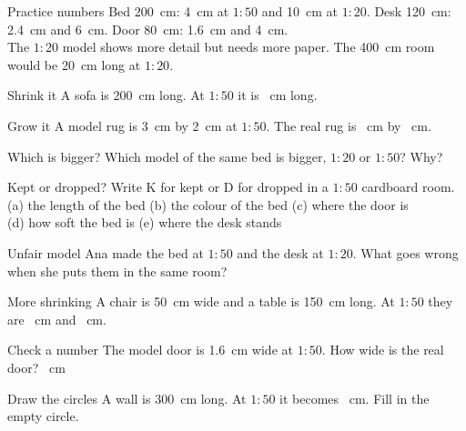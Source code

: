 \begin{worked}{Practice numbers}
Bed 200~cm: 4~cm at $1:50$ and 10~cm at $1:20$. Desk 120~cm: 2.4~cm and 6~cm. Door 80~cm: 1.6~cm and 4~cm.\\
The $1:20$ model shows more detail but needs more paper. The 400~cm room would be 20~cm long at $1:20$.
\end{worked}

\begin{puzzle}{Shrink it}
A sofa is 200~cm long. At $1:50$ it is \wline[1.6cm]~cm long.
\end{puzzle}

\begin{puzzle}{Grow it}
A model rug is 3~cm by 2~cm at $1:50$. The real rug is \wline[1.6cm]~cm by \wline[1.6cm]~cm.
\end{puzzle}

\begin{puzzle}{Which is bigger?}
Which model of the same bed is bigger, $1:20$ or $1:50$? \wline[2cm] Why? \wline[4cm]
\end{puzzle}

\begin{puzzle}{Kept or dropped?}
Write K for kept or D for dropped in a $1:50$ cardboard room.\\
(a) the length of the bed \wline[1cm] \quad (b) the colour of the bed \wline[1cm] \quad (c) where the door is \wline[1cm]\\
(d) how soft the bed is \wline[1cm] \quad (e) where the desk stands \wline[1cm]
\end{puzzle}

\begin{puzzle}{Unfair model}
Ana made the bed at $1:50$ and the desk at $1:20$. What goes wrong when she puts them in the same room? \wline[6cm]
\end{puzzle}

\clearpage

\begin{puzzle}{More shrinking}
A chair is 50~cm wide and a table is 150~cm long. At $1:50$ they are \wline[1.2cm]~cm and \wline[1.2cm]~cm.
\end{puzzle}

\begin{puzzle}{Check a number}
The model door is 1.6~cm wide at $1:50$. How wide is the real door? \wline[1.6cm]~cm
\end{puzzle}

\begin{puzzle}{Draw the circles}
A wall is 300~cm long. At $1:50$ it becomes \wline[1.2cm]~cm. Fill in the empty circle.
\begin{center}
\end{center}
\end{puzzle}

